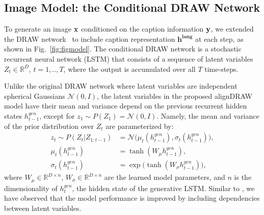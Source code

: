 \documentclass{article} %
\newcommand{\Figref}[1]{Fig.~\ref{#1}}
\newcommand{\hlangall}{\boldsymbol{h^{lang}}}
\newcommand{\hdec}{h^{gen}}
\newcommand{\lat}{z}
\newcommand{\Lat}{Z}
\newcommand{\oimage}{{\bf{x}}}
\newcommand{\prior}{P}
\begin{document}
\subsection{Image Model: the Conditional DRAW Network}

To generate an image $\oimage$ conditioned on the caption information $\bf{y}$, 
we extended the DRAW network~\citep{gregor_draw} to include caption representation $\hlangall$ at each step, as shown in \Figref{fig:figmodel}. 
The conditional DRAW network is a stochastic recurrent neural network (LSTM) that consists of a 
sequence of latent variables $\Lat_t \in \mathbb{R}^D$, $t=1,..,T$, where the output is accumulated over all $T$ time-steps.

Unlike the original DRAW network where latent variables are independent 
spherical Gaussians $\mathcal{N}(0, I)$, the latent variables in the proposed alignDRAW model have their mean and variance depend on the previous recurrent hidden states $\hdec_{t-1}$, except for $\lat_1 \sim \prior(\Lat_1) = \mathcal{N}(0, I)$.  
Namely, the mean and variance of the prior distribution over $\Lat_t$ are parameterized by: 
\begin{align}
\lat_t \sim \prior(\Lat_t|\Lat_{1:t-1}) &= \mathcal{N}\bigg(\mu_{t}(\hdec_{t-1}), \sigma_{t}(\hdec_{t-1})\bigg),\\
\mu_{t}(\hdec_{t-1}) &= \tanh(W_{\mu}\hdec_{t-1}),\\
\sigma_{t}(\hdec_{t-1}) &= \exp\big(\tanh(W_{\sigma}\hdec_{t-1})\big),
\end{align}
where $W_{\mu} \in \mathbb{R}^{D \times n}$, $W_{\sigma} \in \mathbb{R}^{D \times n}$ are 
the learned model parameters, and $n$ is the dimensionality of $\hdec_{t}$,
the hidden state of the generative LSTM. 
Similar to \cite{bachman_sdm}, we have observed that 
the model performance is improved by including dependencies between latent variables. 
\end{document}
